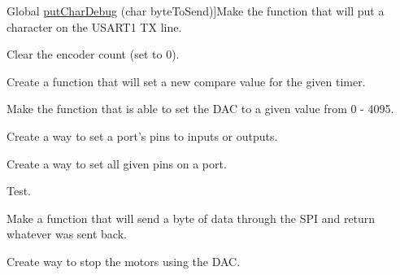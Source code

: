 \begin{DoxyRefList}
\hypertarget{todo__todo000025}{}%
Global \hyperlink{_u_s_a_r_t_debug_8c_ab52220b9802762326175f5a6d09c50a1}{put\-Char\-Debug} (char byte\-To\-Send)]Make the function that will put a character on the U\-S\-A\-R\-T1 T\-X line.  
\item[\label{todo__todo000013}%
\hypertarget{todo__todo000013}{}%
Global \hyperlink{_periph_8h_a9b159db17b7ebf680a2bdd169e269f85}{reset\-Enc\-Count} (int chan)]Clear the encoder count (set to 0).  
\item[\label{todo__todo000022}%
\hypertarget{todo__todo000022}{}%
Global \hyperlink{timer_8c_a3aa09ed8f7935a36b02d8cfb0d69821e}{set\-Comp\-Value} (unsigned char timer, unsigned long comp)]Create a function that will set a new compare value for the given timer.  
\item[\label{todo__todo000004}%
\hypertarget{todo__todo000004}{}%
Global \hyperlink{_d_a_c_8c_af5aa1a81aa11a072a5ab582d040b3edf}{set\-D\-A\-C} (int D\-A\-Cn, int S\-P\-I\-Val)]Make the function that is able to set the D\-A\-C to a given value from 0 -\/ 4095.  
\item[\label{todo__todo000016}%
\hypertarget{todo__todo000016}{}%
Global \hyperlink{ports_8c_a1b62a36451c75cf20221c12f039ad6f4}{set\-Pins\-Dir} (char port, int dir, char num\-Pins,...)]Create a way to set a port's pins to inputs or outputs.  
\item[\label{todo__todo000018}%
\hypertarget{todo__todo000018}{}%
Global \hyperlink{ports_8c_adb1daee6b24466eff4584fb632b5aeac}{set\-Pins\-Val} (char port, int val, char num\-Pins,...)]Create a way to set all given pins on a port.  
\item[\label{todo__todo000023}%
\hypertarget{todo__todo000023}{}%
Global \hyperlink{timer_8c_a6c16a31642845dad0390aa67d2462f40}{set\-Timer\-Interrupt} (unsigned char timer, Callback callback)]Test.  
\item[\label{todo__todo000020}%
\hypertarget{todo__todo000020}{}%
Global \hyperlink{_s_p_i_8c_a7c12c0fba13e058def7883b526d40eb6}{spi\-Transceive} (unsigned char data)]Make a function that will send a byte of data through the S\-P\-I and return whatever was sent back.  
\item[\label{todo__todo000005}%
\hypertarget{todo__todo000005}{}%
Global \hyperlink{motors_8h_a5260da8b51f5d97f6cf2a9ba11d1aee1}{stop\-Motors} ()]Create way to stop the motors using the D\-A\-C. 
\end{DoxyRefList}